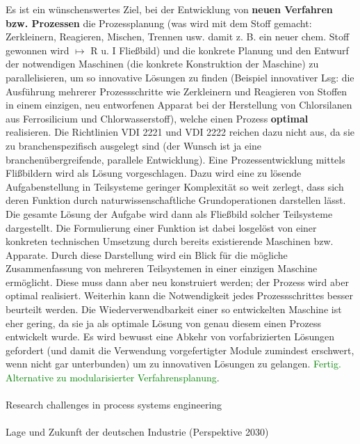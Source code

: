 Es ist ein w\"unschenswertes Ziel, bei der Entwicklung von \textbf{neuen Verfahren bzw. Prozessen} die Prozessplanung (was wird mit dem Stoff gemacht: Zerkleinern, Reagieren, Mischen, Trennen usw. damit z. B. ein neuer chem. Stoff gewonnen wird $\mapsto$ R u. I Flie\ss{}bild) und die konkrete Planung und den Entwurf der notwendigen Maschinen (die konkrete Konstruktion der Maschine) zu parallelisieren, um so innovative L\"osungen zu finden (Beispiel innovativer Lsg: die Ausf\"uhrung mehrerer Prozessschritte wie Zerkleinern und Reagieren von Stoffen in einem einzigen, neu entworfenen Apparat bei der Herstellung von Chlorsilanen aus Ferrosilicium und Chlorwasserstoff), welche einen Prozess \textbf{optimal} realisieren. Die Richtlinien VDI 2221 und VDI 2222 reichen dazu nicht aus, da sie zu branchenspezifisch ausgelegt sind (der Wunsch ist ja eine branchen\"ubergreifende, parallele Entwicklung). Eine Prozessentwicklung mittels Fli\ss{}bildern wird als L\"osung vorgeschlagen. Dazu wird eine zu l\"osende Aufgabenstellung in Teilsysteme geringer Komplexit\"at so weit zerlegt, dass sich deren Funktion durch naturwissenschaftliche Grundoperationen darstellen l\"asst. Die gesamte L\"osung der Aufgabe wird dann als Flie\ss{}bild solcher Teilsysteme dargestellt. Die Formulierung einer Funktion  ist dabei losgel\"ost von einer konkreten technischen Umsetzung durch bereits existierende Maschinen bzw. Apparate. Durch diese Darstellung wird ein Blick f\"ur die m\"ogliche Zusammenfassung von mehreren Teilsystemen in einer einzigen Maschine erm\"oglicht. Diese muss dann aber neu konstruiert werden; der Prozess wird aber optimal realisiert. Weiterhin kann die  Notwendigkeit jedes Prozessschrittes besser beurteilt werden. Die Wiederverwendbarkeit einer so entwickelten Maschine ist eher gering, da sie ja als optimale L\"osung von genau diesem einen Prozess entwickelt wurde. Es wird bewusst eine Abkehr von vorfabrizierten L\"osungen gefordert (und damit die Verwendung vorgefertigter Module zumindest erschwert, wenn nicht gar unterbunden) um zu innovativen L\"osungen zu gelangen.
\textcolor{green}{Fertig. Alternative zu modularisierter Verfahrensplanung}.

\paragraph*{\cite{Grossmann_2000}} Research challenges in process systems engineering

\paragraph*{\cite{PerspektiveD_2016}} Lage und Zukunft der deutschen Industrie (Perspektive 2030)

